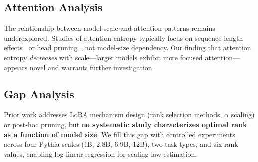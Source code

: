 \subsection{Attention Analysis}

The relationship between model scale and attention patterns remains underexplored. Studies of attention entropy typically focus on sequence length effects~\cite{child2019sparse} or head pruning~\cite{voita2019heads}, not model-size dependency. Our finding that attention entropy \emph{decreases} with scale---larger models exhibit more focused attention---appears novel and warrants further investigation.

\subsection{Gap Analysis}

Prior work addresses LoRA mechanism design (rank selection methods, $\alpha$ scaling) or post-hoc pruning, but \textbf{no systematic study characterizes optimal rank as a function of model size}. We fill this gap with controlled experiments across four Pythia scales (1B, 2.8B, 6.9B, 12B), two task types, and six rank values, enabling log-linear regression for scaling law estimation.
